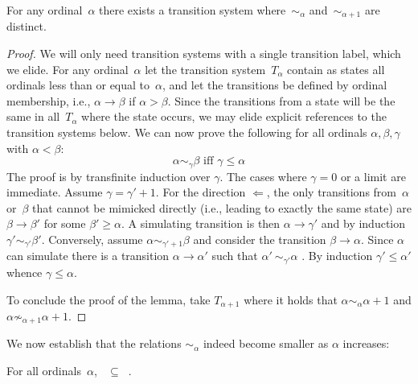 \documentclass{CSML}
\theoremstyle{definition}
\begin{document}
\begin{lem}
\label{distinct-equivalences}
For any ordinal~$\alpha$ there exists a transition system
where~$\sim_\alpha$ and~$\sim_{\alpha+1}$ are distinct.
\end{lem}

\begin{proof}
We will only need transition systems with a single transition label,
which we elide.  For any ordinal~$\alpha$ let the transition
system~$T_\alpha$ contain as states all ordinals less than or equal
to~$\alpha$, and let the transitions be defined by ordinal membership,
i.e., $\alpha \longrightarrow \beta$ if $\alpha > \beta$. Since the
transitions from a state will be the same in all~$T_\alpha$ where the
state occurs, we may elide explicit references to the transition
systems below.  We can now prove the following for all ordinals
$\alpha, \beta, \gamma$ with $\alpha < \beta$:
\[\mbox{$\alpha \sim_\gamma \beta$ iff $\gamma \leq \alpha$}\]
The proof is by transfinite induction over $\gamma$.  The cases where
$\gamma=0$ or a limit are immediate. Assume $\gamma = \gamma' +
1$. For the direction $\Leftarrow$, the only transitions from~$\alpha$
or~$\beta$ that cannot be mimicked directly (i.e., leading to exactly
the same state) are $\beta \longrightarrow \beta'$ for some $\beta'
\geq \alpha$.  A simulating transition is then $\alpha \longrightarrow
\gamma'$ and by induction $\gamma' \sim_{\gamma'} \beta'$.
Conversely, assume $\alpha \sim_{\gamma'+1} \beta$ and consider the
transition $\beta \longrightarrow \alpha$.  Since $\alpha$ can
simulate there is a transition $\alpha \longrightarrow \alpha'$ such
that $\alpha' \ \sim_{\gamma'} \alpha$ . By induction $\gamma' \leq
\alpha'$ whence $\gamma \leq \alpha$.

To conclude the proof of the lemma, take $T_{\alpha+1}$ where it holds
that $\alpha \sim_\alpha \alpha+1$ and $\alpha \not\sim_{\alpha+1}
\alpha+1$.
\end{proof}

We now establish that the relations $\sim_\alpha$ indeed become
smaller as $\alpha$ increases:

\begin{lem}
\label{stratifications-successor}
For all ordinals~$\alpha$, $\mathop{\sim_{\alpha+1}} \subseteq
\mathop{\sim_\alpha}$.
\end{lem}
\end{document}
